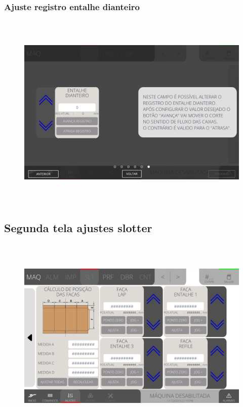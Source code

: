 \newpage
\thispagestyle{fancy}
\vspace*{40 pt}
\subsubsection{\small{Ajuste registro entalhe dianteiro}}
\vspace*{\fill}
\begin{figure}[h]
  \centering
  \includegraphics[width=576px,height=360px]{src/imagesFlexo/05-slotter/settings/e-6.png}
\end{figure}
\vspace*{\fill}

\newpage
\thispagestyle{fancy}
\vspace*{40 pt}
\subsection{Segunda tela ajustes slotter}
\vspace*{\fill}
\begin{figure}[h]
  \centering
  \includegraphics[width=576px,height=360px]{src/imagesFlexo/05-slotter/settings/e-Tela-Principal-2.png}
\end{figure}
\vspace*{\fill}

